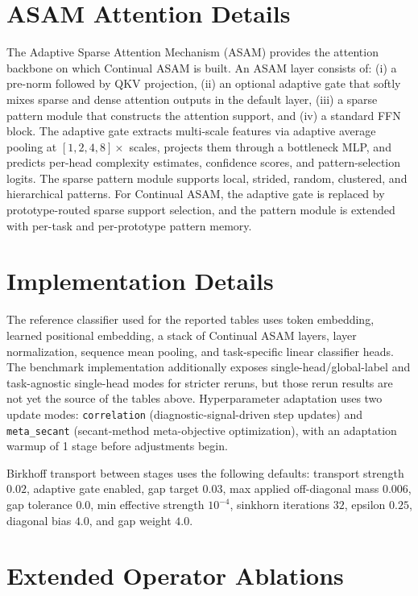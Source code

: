 \documentclass[11pt,a4paper]{article}
\theoremstyle{definition}
\begin{document}
\section{ASAM Attention Details}
\label{sec:asam-details}

The Adaptive Sparse Attention Mechanism (ASAM) provides the attention backbone on which Continual ASAM is built. An ASAM layer consists of: (i) a pre-norm followed by QKV projection, (ii) an optional adaptive gate that softly mixes sparse and dense attention outputs in the default layer, (iii) a sparse pattern module that constructs the attention support, and (iv) a standard FFN block. The adaptive gate extracts multi-scale features via adaptive average pooling at $[1, 2, 4, 8] \times$ scales, projects them through a bottleneck MLP, and predicts per-head complexity estimates, confidence scores, and pattern-selection logits. The sparse pattern module supports local, strided, random, clustered, and hierarchical patterns. For Continual ASAM, the adaptive gate is replaced by prototype-routed sparse support selection, and the pattern module is extended with per-task and per-prototype pattern memory.

\section{Implementation Details}
\label{sec:implementation}

The reference classifier used for the reported tables uses token embedding, learned positional embedding, a stack of Continual ASAM layers, layer normalization, sequence mean pooling, and task-specific linear classifier heads. The benchmark implementation additionally exposes single-head/global-label and task-agnostic single-head modes for stricter reruns, but those rerun results are not yet the source of the tables above. Hyperparameter adaptation uses two update modes: \texttt{correlation} (diagnostic-signal-driven step updates) and \texttt{meta\_secant} (secant-method meta-objective optimization), with an adaptation warmup of 1 stage before adjustments begin.

Birkhoff transport between stages uses the following defaults: transport strength $0.02$, adaptive gate enabled, gap target $0.03$, max applied off-diagonal mass $0.006$, gap tolerance $0.0$, min effective strength $10^{-4}$, sinkhorn iterations $32$, epsilon $0.25$, diagonal bias $4.0$, and gap weight $4.0$.

\section{Extended Operator Ablations}
\label{sec:extended-ablation}
\end{document}
